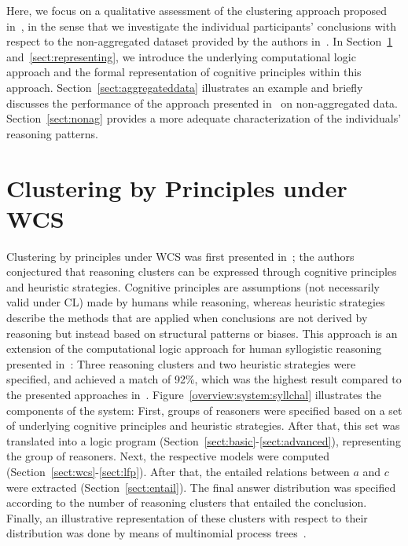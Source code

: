 \documentclass[12pt]{article}
\begin{document}
Here, we focus on a qualitative assessment of the clustering approach proposed in~\cite{declare:2017},
in the sense that we investigate the individual participants' conclusions with respect to the non-aggregated dataset provided by the authors in~\cite{khemlani:2016}.
In Section~\ref{sect:wcsclustering} and~\ref{sect:representing}, we introduce the underlying computational logic approach and the formal representation of cognitive principles within this approach. Section~\ref{sect:aggregateddata} illustrates an example and briefly discusses the performance of the approach presented in~\cite{declare:2017} on non-aggregated data.
Section~\ref{sect:nonag} provides a more adequate characterization of the individuals' reasoning patterns.

\section{Clustering by Principles under WCS} \label{sect:wcsclustering}

Clustering by principles under WCS was first presented in~\cite{declare:2017};
the authors conjectured that reasoning clusters can be expressed through cognitive principles and heuristic strategies. Cognitive principles are assumptions (not necessarily valid under CL) made by humans while reasoning, 
whereas heuristic strategies describe the methods that are applied when
conclusions are not derived by reasoning but instead based on structural patterns or {biases}.
This approach is an extension of the computational logic approach for human syllogistic reasoning presented in~\cite{cogsci:2017}: Three reasoning clusters and two heuristic strategies were specified, and achieved a match of 92\;\%, which was the highest result compared to the presented approaches in~\cite{khemlani:2012}.
Figure~\ref{overview:system:syllchal} illustrates the components of the system:
First, groups of reasoners were specified based on a set of underlying cognitive principles and heuristic strategies.
After that, this set was translated into a logic program (Section~\ref{sect:basic}-\ref{sect:advanced}), representing the group of reasoners.
Next, the respective models were computed (Section~\ref{sect:wcs}-\ref{sect:lfp}).
After that, the entailed relations between $a$ and $c$ were extracted (Section~\ref{sect:entail}). 
 The final answer distribution was specified according to the number of reasoning clusters 
that entailed the conclusion.
Finally, an illustrative representation of these clusters with respect to their distribution was done by means of multinomial process trees~\cite{Riefer1988}.
\end{document}
